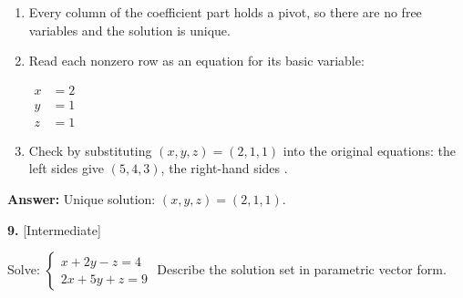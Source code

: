 \documentclass[11pt]{article}
\begin{document}
\begin{tcolorbox}[breakable,colback=ans,colframe=ansb,boxrule=0.5pt,left=4pt,right=4pt,top=2pt,bottom=2pt]
\begin{enumerate}[leftmargin=2.2em,itemsep=1pt,topsep=1pt,label=\textbf{Step \arabic*.}]
\item Every column of the coefficient part holds a pivot, so there are no free variables and the solution is unique.
\item Read each nonzero row as an equation for its basic variable:\par\smallskip $\displaystyle\begin{aligned}x&=2\\ y&=1\\ z&=1\end{aligned}$
\item Check by substituting $(x,y,z)=(2,1,1)$ into the original equations: the left sides give $(5,4,3)$, the right-hand sides \checkmark.
\end{enumerate}\textbf{Answer:} Unique solution: $(x,y,z)=(2,1,1)$.\end{tcolorbox}
\par\vspace{2pt}
\begin{minipage}{\linewidth}\textbf{9.} \hfill{\scriptsize\color{ink}[Intermediate]}\par\nopagebreak Solve: $\begin{cases}x+2y-z=4\\ 2x+5y+z=9\end{cases}$ Describe the solution set in parametric vector form.
\end{minipage}\par\nopagebreak
\end{document}
